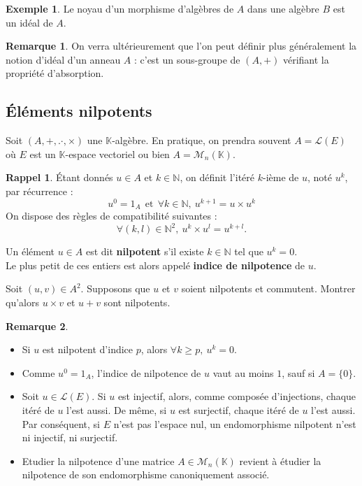 \documentclass[french]{article}
\newcommand{\N}{\mathbb{N}}
\newcommand{\K}{\mathbb{K}}
\theoremstyle{plain}
\theoremstyle{definition}
\newtheorem*{ex}{Exemple}
\newtheorem*{rmq}{Remarque}
\newtheorem*{rappel}{Rappel}
\theoremstyle{remark}
\begin{document}
\begin{ex}
	Le noyau d'un morphisme d'algèbres de $A$ dans une algèbre $B$ est un idéal de $A$.
\end{ex}

\begin{rmq}
	On verra ultérieurement que l'on peut définir plus généralement la notion d'idéal d'un anneau $A$ : c'est un sous-groupe de $(A,+)$ vérifiant la propriété d'absorption.
\end{rmq}

\subsection{Éléments nilpotents}

Soit $(A,+,.\cdot,\times)$ une $\K$-algèbre. En pratique, on prendra souvent $A=\mathcal{L}(E)$ où $E$ est un $\K$-espace vectoriel ou bien $A=\mathcal{M}_n(\K)$.

\begin{rappel}
	Étant donnés $u\in A$ et $k\in\N$, on définit l'itéré $k$-ième de $u$, noté $u^k$, par récurrence : $$u^0=1_A\ \ \text{et}\ \ \forall k\in\N,\ u^{k+1}=u\times u^k$$ On dispose des règles de compatibilité suivantes : $$\forall (k,l)\in\N^2,\ u^k\times u^l=u^{k+l}.$$
\end{rappel}

\begin{dfn}
	Un élément $u\in A$ est dit \textbf{nilpotent} s'il existe $k\in\N$ tel que $u^k=0$. \\ Le plus petit de ces entiers est alors appelé \textbf{indice de nilpotence} de $u$.
\end{dfn}

\begin{exo}
	Soit $(u,v)\in A^2$. Supposons que $u$ et $v$ soient nilpotents et commutent. Montrer qu'alors $u\times v$ et $u+v$ sont nilpotents.
\end{exo}

\begin{rmq}
	\begin{itemize}
		\item Si $u$ est nilpotent d'indice $p$, alors $\forall k\geqslant p,\ u^k=0$.
		\item Comme $u^0=1_A$, l'indice de nilpotence de $u$ vaut au moins $1$, sauf si $A=\{0\}$.
		\item Soit $u\in\mathcal{L}(E)$. Si $u$ est injectif, alors, comme composée d'injections, chaque itéré de $u$ l'est aussi. De même, si $u$ est surjectif, chaque itéré de $u$ l'est aussi. Par conséquent, si $E$ n'est pas l'espace nul, un endomorphisme nilpotent n'est ni injectif, ni surjectif.
		\item Etudier la nilpotence d'une matrice $A\in\mathcal{M}_n(\K)$ revient à étudier la nilpotence de son endomorphisme canoniquement associé.
	\end{itemize}
\end{rmq}
\end{document}
